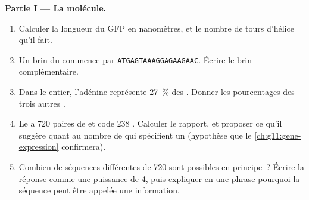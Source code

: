 \begin{problem}
\medskip
\noindent\textbf{Partie I --- La molécule.}
\begin{enumerate}
  \item Calculer la longueur du  GFP en nanomètres, et le nombre
        de tours d'hélice qu'il fait.
  \item Un brin du  commence par \texttt{ATGAGTAAAGGAGAAGAAC}.
        Écrire le brin complémentaire.
  \item Dans le  entier, l'adénine représente 27~\% des .
        Donner les pourcentages des trois autres .
  \item Le  a 720 paires de  et code 238 .
        Calculer le rapport, et proposer ce qu'il suggère quant au
        nombre de  qui spécifient un  (hypothèse que le
        \cref{ch:g11:gene-expression} confirmera).
  \item Combien de séquences différentes de 720  sont possibles en
        principe~? Écrire la réponse comme une puissance de 4, puis
        expliquer en une phrase pourquoi la séquence peut être appelée
        une information.
\end{enumerate}


\end{problem}
